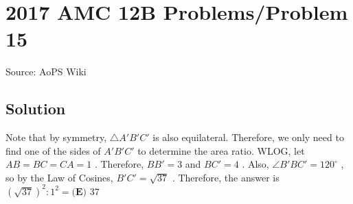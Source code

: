 \documentclass[12pt]{article}
\begin{document}
\section*{{2017 AMC 12B Problems/Problem 15}}
Source: AoPS Wiki

\subsection*{Solution}
Note that by symmetry, $\triangle A'B'C'$ is also equilateral. Therefore, we only need to find one of the sides of $A'B'C'$ to determine the area ratio. WLOG, let $AB = BC = CA = 1$ . Therefore, $BB' = 3$ and $BC' = 4$ . Also, $\angle B'BC' = 120^{\circ}$ , so by the Law of Cosines, $B'C' = \sqrt{37}$ . Therefore, the answer is $(\sqrt{37})^2 : 1^2 = \boxed{\textbf{(E) } 37}$
\end{document}
